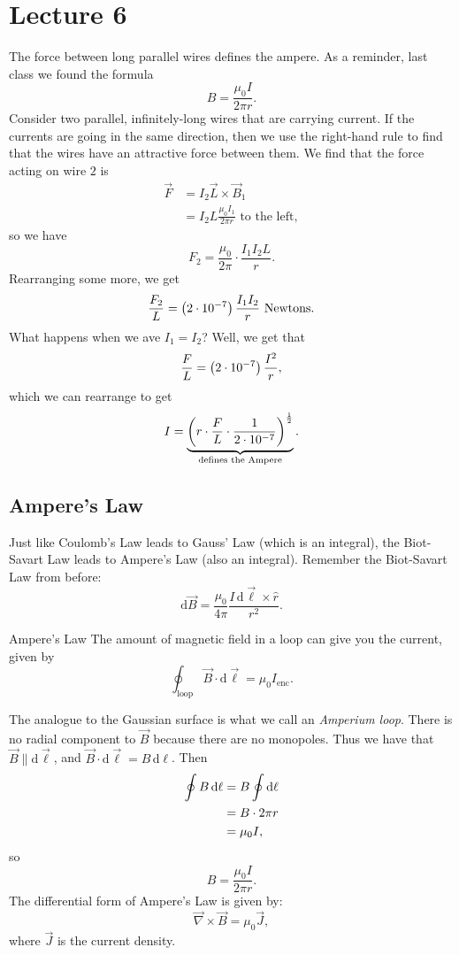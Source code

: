 \documentclass[class=article, crop=false]{standalone}
\begin{document}
  \section{Lecture 6}
  The force between long parallel wires defines the ampere. As a reminder, last class we found the formula
  \[
    B = \frac{\mu_0I}{2\pi r}.
  \]
  Consider two parallel, infinitely-long wires that are carrying current. If the currents are going in the same direction, then we use the right-hand rule to find that the wires have an attractive force between them. We find that the force acting on wire $2$ is
  \begin{align*}
    \vec{F} &= I_2\vec{L}\times \vec{B}_1 \\
            &= I_2L \frac{\mu_0I_1}{2\pi r} \text{ to the left},
  \end{align*}
  so we have
  \[
    F_2 = \frac{\mu_0}{2\pi}\cdot \frac{I_1I_2L}{r}.
  \]
  Rearranging some more, we get
  \[
    \frac{F_2}{L} = \left( 2\cdot 10^{-7} \right) \frac{I_1I_2}{r} \text{ Newtons}.
  \]
  What happens when we ave $I_1 = I_2$? Well, we get that
  \[
    \frac{F}{L}= \left( 2\cdot 10^{-7} \right) \frac{I^2}{r},
  \]
  which we can rearrange to get
  \[
    I = \underbrace{\left( r\cdot \frac{F}{L}\cdot \frac{1}{2\cdot 10^{-7}} \right)^{\frac{1}{2}}}_{\text{defines the Ampere}}.
  \]
  \subsection{Ampere's Law}
  Just like Coulomb's Law leads to Gauss' Law (which is an integral), the Biot-Savart Law leads to Ampere's Law (also an integral). Remember the Biot-Savart Law from before:
  \[
    \mathrm{d}\vec{B} = \frac{\mu_0}{4\pi} \frac{I\,\mathrm{d}\vec{\ell}\times \hat{r}}{r^2}.
  \]
  \begin{theorem}{Ampere's Law}
    The amount of magnetic field in a loop can give you the current, given by
    \[
      \oint_\text{loop}\vec{B}\cdot \mathrm{d}\vec{\ell} = \mu_0I_\text{enc}.
    \]
  \end{theorem}
  The analogue to the Gaussian surface is what we call an \emph{Amperium loop}. There is no radial component to $\vec{B}$ because there are no monopoles. Thus we have that $\vec{B}\parallel \mathrm{d}\vec{\ell}$, and $\vec{B}\cdot \mathrm{d}\vec{\ell} = B\,\mathrm{d}\ell$. Then
  \begin{align*}
    \oint B\,\mathrm{d}\ell &= B\oint \mathrm{d}\ell \\
                   &= B\cdot 2\pi r \\
                   &= \mu_0I,
  \end{align*}
  so
  \[
    B = \frac{\mu_0I}{2\pi r}.
  \]
  The differential form of Ampere's Law is given by:
  \[
    \vec{\nabla}\times \vec{B} = \mu_0\vec{J},
  \]
  where $\vec{J}$ is the current density.
\end{document}
